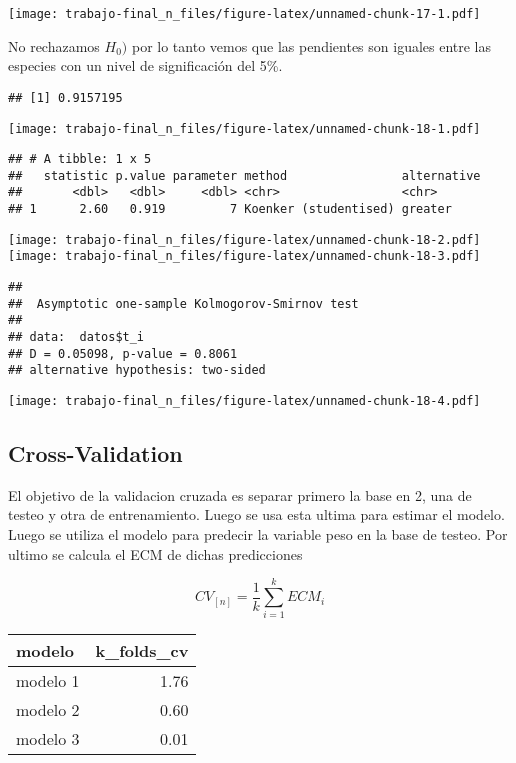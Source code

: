 \documentclass[
]{article}
\begin{document}
\texttt{[image: trabajo-final\_n\_files/figure-latex/unnamed-chunk-17-1.pdf]}

No rechazamos \(H_0)\) por lo tanto vemos que las pendientes son iguales
entre las especies con un nivel de significación del 5\%.

\begin{verbatim}
## [1] 0.9157195
\end{verbatim}

\texttt{[image: trabajo-final\_n\_files/figure-latex/unnamed-chunk-18-1.pdf]}

\begin{verbatim}
## # A tibble: 1 x 5
##   statistic p.value parameter method                alternative
##       <dbl>   <dbl>     <dbl> <chr>                 <chr>      
## 1      2.60   0.919         7 Koenker (studentised) greater
\end{verbatim}

\texttt{[image: trabajo-final\_n\_files/figure-latex/unnamed-chunk-18-2.pdf]}
\texttt{[image: trabajo-final\_n\_files/figure-latex/unnamed-chunk-18-3.pdf]}

\begin{verbatim}
## 
##  Asymptotic one-sample Kolmogorov-Smirnov test
## 
## data:  datos$t_i
## D = 0.05098, p-value = 0.8061
## alternative hypothesis: two-sided
\end{verbatim}

\texttt{[image: trabajo-final\_n\_files/figure-latex/unnamed-chunk-18-4.pdf]}

\subsection{Cross-Validation}\label{cross-validation}

El objetivo de la validacion cruzada es separar primero la base en 2,
una de testeo y otra de entrenamiento. Luego se usa esta ultima para
estimar el modelo. Luego se utiliza el modelo para predecir la variable
peso en la base de testeo. Por ultimo se calcula el ECM de dichas
predicciones

\[CV_{[n]}= \frac{1}{k}\sum_{i=1}^kECM_{i}\]

\begingroup\fontsize{8}{10}\selectfont

\begin{longtable}[t]{lr}
\toprule
modelo & k\_folds\_cv\\
\midrule
modelo 1 & 1.76\\
modelo 2 & 0.60\\
modelo 3 & 0.01\\
\bottomrule
\end{longtable}
\endgroup{}
\end{document}
